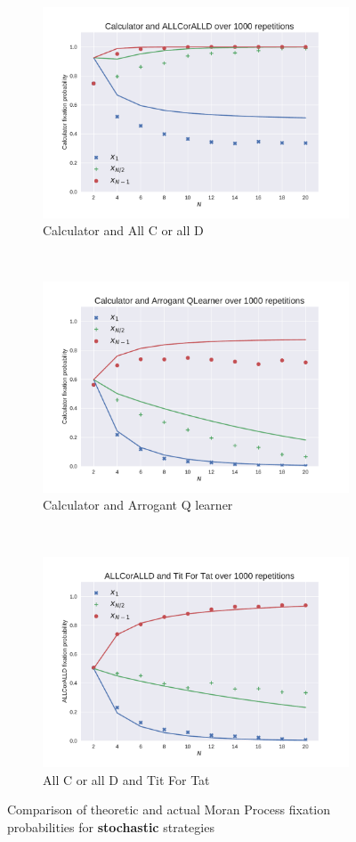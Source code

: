 \documentclass{article}
\begin{document}
\begin{figure}[!hbtp]
    \begin{subfigure}[t]{.3\textwidth}
        \centering
        \includegraphics[width=.8\textwidth]{./img/Calculator_v_ALLCorALLD.pdf}
        \caption{Calculator and All C or all D}
    \end{subfigure}%
    ~
    \begin{subfigure}[t]{.3\textwidth}
        \centering
        \includegraphics[width=.8\textwidth]{./img/Calculator_v_Arrogant_QLearner.pdf}
        \caption{Calculator and Arrogant Q learner}
    \end{subfigure}%
    ~
    \begin{subfigure}[t]{.3\textwidth}
        \centering
        \includegraphics[width=.8\textwidth]{./img/ALLCorALLD_v_Tit_For_Tat.pdf}
        \caption{All C or all D and Tit For Tat}
    \end{subfigure}%
    \caption{Comparison of theoretic and actual Moran Process
             fixation probabilities for \textbf{stochastic} strategies}
    \label{fig:comparison_stochastic}
\end{figure}
\end{document}
